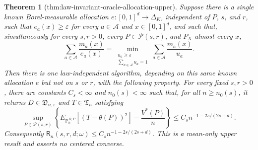 \documentclass{article}
\newtheorem{theorem}{Theorem}
\begin{document}
\begin{theorem}[thm:law-invariant-oracle-allocation-upper]\label{thm:law-invariant-oracle-allocation-upper}
Suppose there is a single known Borel-measurable allocation \(e:[0,1]^d\to\Delta_K\), independent of \(P\), \(s\), and \(r\), such that \(e_a(x)\geq\varepsilon\) for every \(a\in\mathcal A\) and \(x\in[0,1]^d\), and such that, simultaneously for every \(s,r>0\), every \(P\in\mathcal P(s,r)\), and \(P_X\)-almost every \(x\),
\[
\sum_{a\in\mathcal A}\frac{m_a(x)}{e_a(x)}
=\min_{\substack{u_a\geq\varepsilon\\ \sum_{a\in\mathcal A}u_a=1}}
\sum_{a\in\mathcal A}\frac{m_a(x)}{u_a}.
\tag{43}
\]
Then there is one law-independent algorithm, depending on this same known allocation \(e\) but not on \(s\) or \(r\), with the following property. For every fixed \(s,r>0\), there are constants \(C_s<\infty\) and \(n_0(s)<\infty\) such that, for all \(n\geq n_0(s)\), it returns \(D\in\mathfrak D_{n,\varepsilon}\) and \(T\in\mathfrak T_n\) satisfying
\[
\sup_{P\in\mathcal P(s,r)}
\left\{
E_{\mathbb P_n^{D,P}}[(T-\theta(P))^2]-\frac{V^*(P)}n
\right\}
\leq C_s n^{-1-2s/(2s+d)}.
\tag{44}
\]
Consequently \(\mathsf R_n(s,r,d;\omega)\leq C_s n^{-1-2s/(2s+d)}\). This is a mean-only upper result and asserts no centered converse.
\end{theorem}
\end{document}
